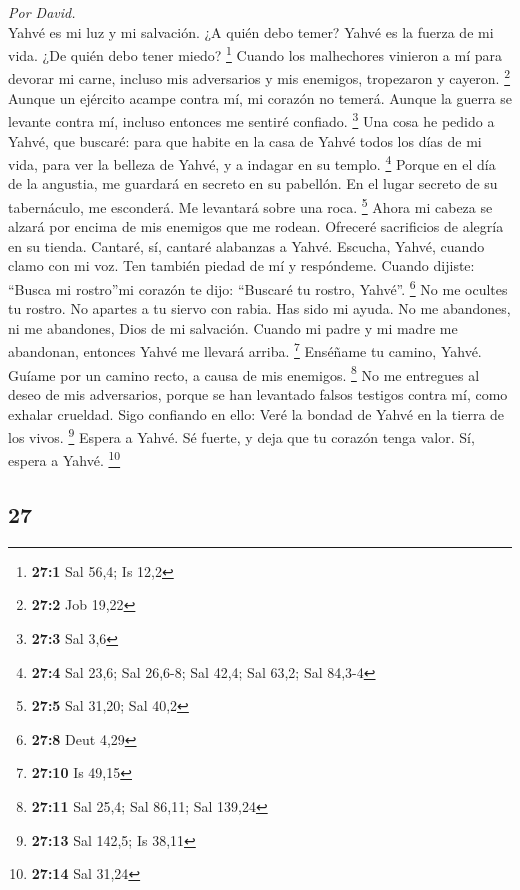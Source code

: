 \begin{paracol}{2}
\emph{Por David.}\\
 Yahvé es mi luz y mi salvación. ¿A quién debo temer?
Yahvé es la fuerza de mi vida. ¿De quién debo tener miedo? \footnote{\textbf{27:1}
  Sal 56,4; Is 12,2}  Cuando los malhechores vinieron a mí
para devorar mi carne, incluso mis adversarios y mis enemigos,
tropezaron y cayeron. \footnote{\textbf{27:2} Job 19,22} 
Aunque un ejército acampe contra mí, mi corazón no temerá. Aunque la
guerra se levante contra mí, incluso entonces me sentiré confiado.
\footnote{\textbf{27:3} Sal 3,6}  Una cosa he pedido a
Yahvé, que buscaré: para que habite en la casa de Yahvé todos los días
de mi vida, para ver la belleza de Yahvé, y a indagar en su templo.
\footnote{\textbf{27:4} Sal 23,6; Sal 26,6-8; Sal 42,4; Sal 63,2; Sal
  84,3-4}  Porque en el día de la angustia, me guardará en
secreto en su pabellón. En el lugar secreto de su tabernáculo, me
esconderá. Me levantará sobre una roca. \footnote{\textbf{27:5} Sal
  31,20; Sal 40,2}  Ahora mi cabeza se alzará por encima
de mis enemigos que me rodean. Ofreceré sacrificios de alegría en su
tienda. Cantaré, sí, cantaré alabanzas a Yahvé.  Escucha,
Yahvé, cuando clamo con mi voz. Ten también piedad de mí y respóndeme.
 Cuando dijiste: ``Busca mi rostro''mi corazón te dijo:
``Buscaré tu rostro, Yahvé''. \footnote{\textbf{27:8} Deut 4,29}
 No me ocultes tu rostro. No apartes a tu siervo con
rabia. Has sido mi ayuda. No me abandones, ni me abandones, Dios de mi
salvación.  Cuando mi padre y mi madre me abandonan,
entonces Yahvé me llevará arriba. \footnote{\textbf{27:10} Is 49,15}
 Enséñame tu camino, Yahvé. Guíame por un camino recto, a
causa de mis enemigos. \footnote{\textbf{27:11} Sal 25,4; Sal 86,11; Sal
  139,24}  No me entregues al deseo de mis adversarios,
porque se han levantado falsos testigos contra mí, como exhalar
crueldad.  Sigo confiando en ello: Veré la bondad de
Yahvé en la tierra de los vivos. \footnote{\textbf{27:13} Sal 142,5; Is
  38,11}  Espera a Yahvé. Sé fuerte, y deja que tu
corazón tenga valor. Sí, espera a Yahvé. \footnote{\textbf{27:14} Sal
  31,24}

\switchcolumn
\begin{otherlanguage}{english}

\hypertarget{section-53}{%
\section{27}\label{section-53}}


\end{otherlanguage}
\end{paracol}

